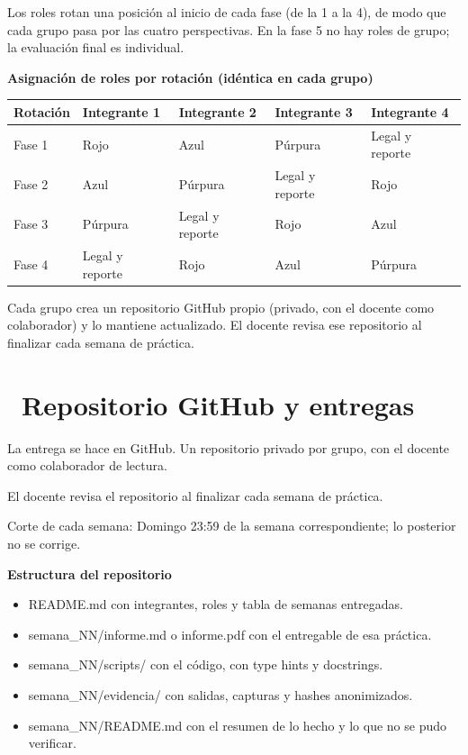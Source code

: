 \documentclass[11pt,a4paper]{article}
\newcommand{\iconotexto}[2]{\textcolor{cyanNeon}{\faIcon{#1}}~#2}
\begin{document}
Los roles rotan una posición al inicio de cada fase (de la 1 a la 4), de modo que cada grupo pasa por las cuatro perspectivas. En la fase 5 no hay roles de grupo; la evaluación final es individual.

\textbf{Asignación de roles por rotación (idéntica en cada grupo)}

\begin{tabularx}{\linewidth}{@{}l X X X X@{}}
\toprule
Rotación & Integrante 1 & Integrante 2 & Integrante 3 & Integrante 4 \\
\midrule
Fase 1 & Rojo & Azul & Púrpura & Legal y reporte \\
Fase 2 & Azul & Púrpura & Legal y reporte & Rojo \\
Fase 3 & Púrpura & Legal y reporte & Rojo & Azul \\
Fase 4 & Legal y reporte & Rojo & Azul & Púrpura \\
\bottomrule
\end{tabularx}

Cada grupo crea un repositorio GitHub propio (privado, con el docente como colaborador) y lo mantiene actualizado. El docente revisa ese repositorio al finalizar cada semana de práctica.

\section{\iconotexto{code-branch}{Repositorio GitHub y entregas}}

La entrega se hace en GitHub. Un repositorio privado por grupo, con el docente como colaborador de lectura.

El docente revisa el repositorio al finalizar cada semana de práctica.

Corte de cada semana: Domingo 23:59 de la semana correspondiente; lo posterior no se corrige.

\textbf{Estructura del repositorio}

\begin{itemize}[leftmargin=1.4em,itemsep=2pt,topsep=3pt]
  \item README.md con integrantes, roles y tabla de semanas entregadas.
  \item semana\_NN/informe.md o informe.pdf con el entregable de esa práctica.
  \item semana\_NN/scripts/ con el código, con type hints y docstrings.
  \item semana\_NN/evidencia/ con salidas, capturas y hashes anonimizados.
  \item semana\_NN/README.md con el resumen de lo hecho y lo que no se pudo verificar.
\end{itemize}
\end{document}
